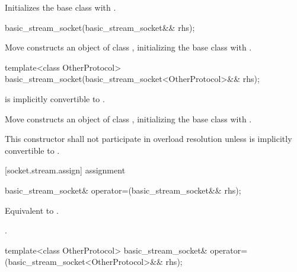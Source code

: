 \begin{itemdescr}
\pnum
\effects Initializes the base class with .
\end{itemdescr}

\begin{itemdecl}
basic_stream_socket(basic_stream_socket&& rhs);
\end{itemdecl}

\begin{itemdescr}
\pnum
\effects Move constructs an object of class , initializing the base class with .
\end{itemdescr}

\begin{itemdecl}
template<class OtherProtocol>
  basic_stream_socket(basic_stream_socket<OtherProtocol>&& rhs);
\end{itemdecl}

\begin{itemdescr}
\pnum
\requires {} is implicitly convertible to .

\pnum
\effects Move constructs an object of class , initializing the base class with .

\pnum
\remarks This constructor shall not participate in overload resolution unless  is implicitly convertible to .
\end{itemdescr}



[socket.stream.assign]{ assignment}

\begin{itemdecl}
basic_stream_socket& operator=(basic_stream_socket&& rhs);
\end{itemdecl}

\begin{itemdescr}
\pnum
\effects Equivalent to .

\pnum
\returns {}.
\end{itemdescr}

\begin{itemdecl}
template<class OtherProtocol>
  basic_stream_socket& operator=(basic_stream_socket<OtherProtocol>&& rhs);
\end{itemdecl}

